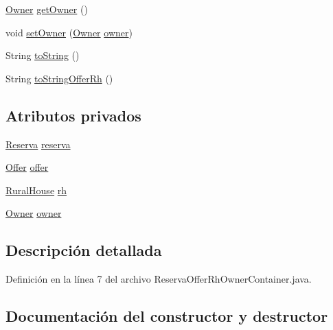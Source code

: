 \begin{DoxyCompactItemize}
\item 
\mbox{\hyperlink{classdomain_1_1_owner}{Owner}} \mbox{\hyperlink{classdomain_1_1_reserva_offer_rh_owner_container_a910d36a8ee7f6bcdd7611ec046e91fce}{get\+Owner}} ()
\item 
void \mbox{\hyperlink{classdomain_1_1_reserva_offer_rh_owner_container_a90dec9bd67969de90e8c99877a810323}{set\+Owner}} (\mbox{\hyperlink{classdomain_1_1_owner}{Owner}} \mbox{\hyperlink{classdomain_1_1_reserva_offer_rh_owner_container_a6d643c4ac5605393774d6a69886d7c3d}{owner}})
\item 
String \mbox{\hyperlink{classdomain_1_1_reserva_offer_rh_owner_container_a784483e076f918173509251d9b88bd4f}{to\+String}} ()
\item 
String \mbox{\hyperlink{classdomain_1_1_reserva_offer_rh_owner_container_a44dfc6ad7f9d01332112f4cf9a07dc4c}{to\+String\+Offer\+Rh}} ()
\end{DoxyCompactItemize}
\subsection*{Atributos privados}
\begin{DoxyCompactItemize}
\item 
\mbox{\hyperlink{classdomain_1_1_reserva}{Reserva}} \mbox{\hyperlink{classdomain_1_1_reserva_offer_rh_owner_container_afcbc4f46e44afcfe5f441462b8628198}{reserva}}
\item 
\mbox{\hyperlink{classdomain_1_1_offer}{Offer}} \mbox{\hyperlink{classdomain_1_1_reserva_offer_rh_owner_container_ad8659a141937db6a13a2afc94ee10302}{offer}}
\item 
\mbox{\hyperlink{classdomain_1_1_rural_house}{Rural\+House}} \mbox{\hyperlink{classdomain_1_1_reserva_offer_rh_owner_container_a96ee8f1952c3b10e5ca8cbf71fdf95cf}{rh}}
\item 
\mbox{\hyperlink{classdomain_1_1_owner}{Owner}} \mbox{\hyperlink{classdomain_1_1_reserva_offer_rh_owner_container_a6d643c4ac5605393774d6a69886d7c3d}{owner}}
\end{DoxyCompactItemize}


\subsection{Descripción detallada}


Definición en la línea 7 del archivo Reserva\+Offer\+Rh\+Owner\+Container.\+java.



\subsection{Documentación del constructor y destructor}
\mbox{\label{classdomain_1_1_reserva_offer_rh_owner_container_a8dd8e74751c3687311a3dc879bf4ec1c}} 
